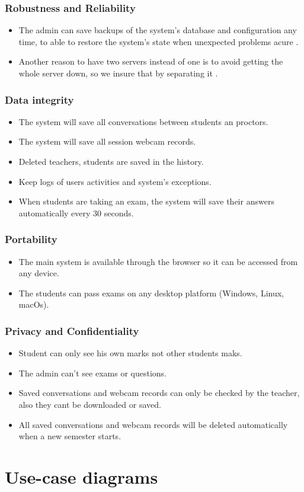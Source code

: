 \documentclass[]{uc2pfecaneva}
\begin{document}
\raggedright\subsubsection{Robustness and Reliability}
\begin{itemize}
	\item The admin can save backups of the system’s database and configuration any time, to able to restore the system’s state when  unexpected problems acure .
	\item Another reason to have two servers instead of one is to avoid getting the whole server down, so we insure that by separating it .
\end{itemize}

\raggedright\subsubsection{Data integrity}
\begin{itemize}
	\item The system will save all conversations between students an proctors.
	\item The system will save all session webcam records.
	\item Deleted teachers, students are saved in the history.
	\item Keep logs of users activities and system’s exceptions.
	\item When students are taking an exam, the system will save their answers automatically every 30 seconds.
\end{itemize}

\raggedright\subsubsection{Portability}
\begin{itemize}
	\item The main system is available through the browser so it can be accessed from any device.
	\item The students can pass exams on any desktop platform (Windows, Linux, macOs).
\end{itemize}

\raggedright\subsubsection{Privacy and Confidentiality}
\begin{itemize}
	\item Student can only see his own marks not other students maks.
	\item The admin can’t see exams or questions.
	\item Saved conversations and webcam records can only be checked by the teacher, also they cant be downloaded or saved.
	\item All saved conversations and webcam records will be deleted automatically when a new semester starts.
\end{itemize}
\raggedright\section{Use-case diagrams}
\end{document}
